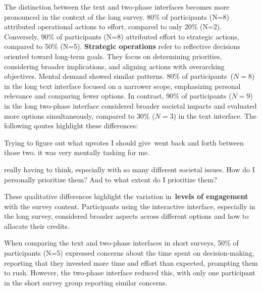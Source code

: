 
The distinction between the text and two-phase interfaces becomes more pronounced in the context of the long survey. 80\% of participants (N=8) attributed operational actions to effort, compared to only 20\% (N=2). Conversely, 90\% of participants (N=8) attributed effort to strategic actions, compared to 50\% (N=5). \textbf{Strategic operations} refer to reflective decisions oriented toward long-term goals. They focus on determining priorities, considering broader implications, and aligning actions with overarching objectives. Mental demand showed similar patterns. 80\% of participants~($N=8$) in the long text interface focused on a narrower scope, emphasizing personal relevance and comparing fewer options. In contrast, 90\% of participants ($N=9$) in the long two-phase interface considered broader societal impacts and evaluated more options simultaneously, compared to 30\% ($N=3$) in the text interface. The following qoutes highlight these differences:

\begin{displayquote}
Trying to figure out what upvotes I should give~\bracketellipsis went back and forth between those two. \bracketellipsis it was very mentally tasking for me. \hfill{}
\end{displayquote}

\begin{displayquote}
\bracketellipsis really having to think, especially with so many different societal issues. How do I personally prioritize them? And to what extent do I prioritize them? \hfill{}
\end{displayquote}

These qualitative differences highlight the variation in~\textbf{levels of engagement} with the survey content. Participants using the interactive interface, especially in the long survey, considered broader aspects across different options and how to allocate their credits.

When comparing the text and two-phase interfaces in short surveys, 50\% of participants (N=5) expressed concerns about the time spent on decision-making, reporting that they invested more time and effort than expected, prompting them to rush. However, the two-phase interface reduced this, with only one participant in the short survey group reporting similar concerns.